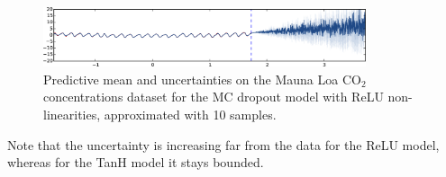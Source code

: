 \documentclass{article}
\theoremstyle{definition}
\begin{document}
\begin{figure}[b!]
	\vspace{-6mm}
	\begin{minipage}{\linewidth}
		\includegraphics[width=\linewidth, height=1.75cm]{figs/exp1/co2_MC_dropout_relu_T10.png}
		\vspace{-7mm}
		\caption{Predictive mean and uncertainties on the Mauna Loa CO$_2$ concentrations dataset for the MC dropout model with ReLU non-linearities, approximated with 10 samples.} \label{fig:MC_10}
	\end{minipage}
\end{figure}

Note that the uncertainty is increasing far from the data for the ReLU model, whereas for the TanH model it stays bounded. 
\end{document}
